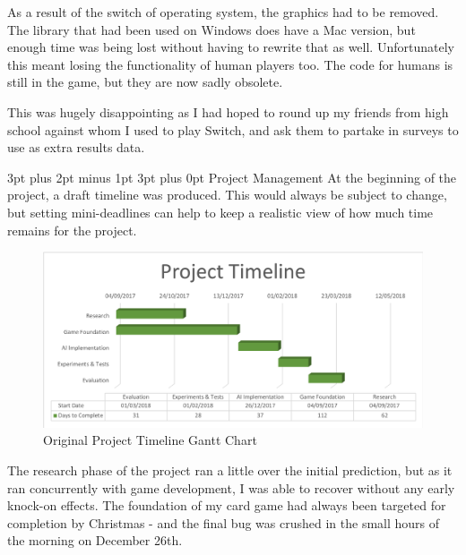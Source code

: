 \documentclass[12pt,a4paper]{article}
\makeatletter
\renewcommand\subsection{\@startsection {subsection}{1}{2mm} %
                               {3pt plus 2pt minus 1pt} %
                               {3pt plus 0pt} %
                               {\normalfont\bfseries}}
\makeatother
\begin{document}
As a result of the switch of operating system, the graphics had to be removed. The library that had been used on Windows does have a Mac version, but enough time was being lost without having to rewrite that as well. Unfortunately this meant losing the functionality of human players too. The code for humans is still in the game, but they are now sadly obsolete. 

This was hugely disappointing as I had hoped to round up my friends from high school against whom I used to play Switch, and ask them to partake in surveys to use as extra results data. 

\newpage
\subsection{Project Management}
At the beginning of the project, a draft timeline was produced. This would always be subject to change, but setting mini-deadlines can help to keep a realistic view of how much time remains for the project.

\begin{figure}[h]
	\centering
	\includegraphics[width = \textwidth]{Gantt1.png}
	\caption{Original Project Timeline Gantt Chart}
\end{figure}


The research phase of the project ran a little over the initial prediction, but as it ran concurrently with game development, I was able to recover without any early knock-on effects. The foundation of my card game had always been targeted for completion by Christmas - and the final bug was crushed in the small hours of the morning on December 26th. 
\end{document}
